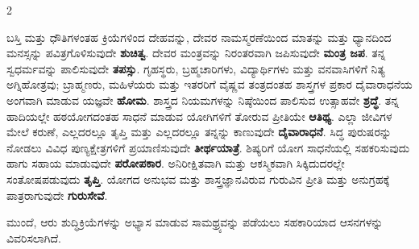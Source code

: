 \begin{multicols}{2}
\begin{kan}
ಬಸ್ತಿ ಮತ್ತು ಧೌತಿಗಳಂತಹ ಕ್ರಿಯೆಗಳಿಂದ ದೇಹವನ್ನು, ದೇವರ ನಾಮಸ್ಮರಣೆಯಿಂದ ಮಾತನ್ನು ಮತ್ತು ಧ್ಯಾನದಿಂದ ಮನಸ್ಸನ್ನು ಪವಿತ್ರಗೊಳಿಸುವುದೇ \textbf{ಶುಚಿತ್ವ}. ದೇವರ ಮಂತ್ರವನ್ನು ನಿರಂತರವಾಗಿ ಜಪಿಸುವುದೇ \textbf{ಮಂತ್ರ ಜಪ}. ತನ್ನ ಸ್ವಧರ್ಮವನ್ನು ಪಾಲಿಸುವುದೇ \textbf{ತಪಸ್ಸು}. ಗೃಹಸ್ಥರು, ಬ್ರಹ್ಮಚಾರಿಗಳು, ವಿದ್ಯಾರ್ಥಿಗಳು ಮತ್ತು ವನವಾಸಿಗಳಿಗೆ ನಿತ್ಯ ಅಗ್ನಿಹೋತ್ರವು; ಬ್ರಾಹ್ಮಣರು, ಮಹಿಳೆಯರು ಮತ್ತು ಇತರರಿಗೆ ವೈಷ್ಣವ ತಂತ್ರದಂತಹ ಶಾಸ್ತ್ರಗಳ ಪ್ರಕಾರ ದೈವಾರಾಧನೆಯ ಅಂಗವಾಗಿ ಮಾಡುವ ಯಜ್ಞವೇ \textbf{ಹೋಮ}. ಶಾಸ್ತ್ರದ ನಿಯಮಗಳನ್ನು ನಿಷ್ಠೆಯಿಂದ ಪಾಲಿಸುವ ಉತ್ಸಾಹವೇ \textbf{ಶ್ರದ್ಧೆ}. ತನ್ನ ಹಾದಿಯಲ್ಲೇ ಹಠಯೋಗದಂತಹ ಸಾಧನೆ ಮಾಡುವ ಯೋಗಿಗಳಿಗೆ ತೋರುವ ಪ್ರೀತಿಯೇ \textbf{ಆತಿಥ್ಯ}. ಎಲ್ಲಾ ಜೀವಿಗಳ ಮೇಲೆ ಕರುಣೆ, ಎಲ್ಲದರಲ್ಲೂ ತೃಪ್ತಿ ಮತ್ತು ಎಲ್ಲದರಲ್ಲೂ ತನ್ನನ್ನು ಕಾಣುವುದೇ \textbf{ದೈವಾರಾಧನೆ}. ಸಿದ್ಧ ಪುರುಷರನ್ನು ನೋಡಲು ವಿವಿಧ ಪುಣ್ಯಕ್ಷೇತ್ರಗಳಿಗೆ ಪ್ರಯಾಣಿಸುವುದೇ \textbf{ತೀರ್ಥಯಾತ್ರೆ}.  ಶಿಷ್ಯರಿಗೆ ಯೋಗ ಸಾಧನೆಯಲ್ಲಿ ಸಹಕರಿಸುವುದು ಹಾಗು ಸಹಾಯ ಮಾಡುವುದೇ \textbf{ಪರೋಪಕಾರ}. ಅನಿರೀಕ್ಷಿತವಾಗಿ ಮತ್ತು ಆಕಸ್ಮಿಕವಾಗಿ ಸಿಕ್ಕಿದುದರಲ್ಲೇ ಸಂತೋಷಪಡುವುದು \textbf{ತೃಪ್ತಿ}. ಯೋಗದ ಅನುಭವ ಮತ್ತು ಶಾಸ್ತ್ರಜ್ಞಾನವಿರುವ ಗುರುವಿನ ಪ್ರೀತಿ ಮತ್ತು ಅನುಗ್ರಹಕ್ಕೆ ಪಾತ್ರರಾಗುವುದೇ \textbf{ಗುರುಸೇವೆ}.
\vskip 7pt


ಮುಂದೆ, ಆರು ಶುದ್ಧಿಕ್ರಿಯೆಗಳನ್ನು ಅಭ್ಯಾಸ ಮಾಡುವ ಸಾಮಥ್ರ್ಯವನ್ನು ಪಡೆಯಲು ಸಹಕಾರಿಯಾದ ಆಸನಗಳನ್ನು ವಿವರಿಸಲಾಗಿದೆ. 
\end{kan}
\end{multicols}



\newpage
